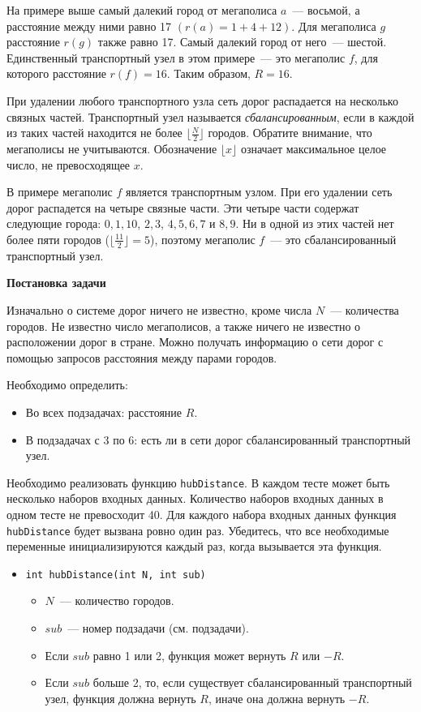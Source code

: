 На примере выше самый далекий город от мегаполиса $a$~--- восьмой, а расстояние между
ними равно 17 $(r(a) = 1 + 4 + 12)$. Для мегаполиса $g$ расстояние $r(g)$ также равно 17.
Самый далекий город от него~--- шестой. Единственный транспортный узел в этом примере~---
это мегаполис $f$, для которого расстояние $r(f) = 16$. Таким образом, $R = 16$.

При удалении любого транспортного узла сеть дорог распадается на несколько связных
частей. Транспортный узел называется \textit{сбалансированным}, если в каждой из таких частей
находится не более $\lfloor \frac{N}{2} \rfloor$ городов. Обратите внимание, что мегаполисы не учитываются.
Обозначение $\lfloor x \rfloor$ означает максимальное целое число, не превосходящее $x$.

В примере мегаполис $f$ является транспортным узлом. При его удалении сеть дорог
распадется на четыре связные части. Эти четыре части содержат следующие города:
{$0,1,10$}, {$2,3$}, {$4,5,6,7$} и {$8,9$}. Ни в одной из этих частей нет более пяти городов
($\lfloor \frac{11}{2} \rfloor = 5$), поэтому мегаполис $f$~--- это сбалансированный транспортный узел.

\textbf{Постановка задачи}

Изначально о системе дорог ничего не известно, кроме числа $N$~--- количества городов. Не
известно число мегаполисов, а также ничего не известно о расположении дорог в стране.
Можно получать информацию о сети дорог с помощью запросов расстояния между парами
городов.

Необходимо определить:
\begin{itemize}
\item Во всех подзадачах: расстояние $R$.
\item В подзадачах с $3$ по $6$: есть ли в сети дорог сбалансированный транспортный узел.
\end{itemize}

Необходимо реализовать функцию \texttt{hubDistance}. В каждом тесте может быть несколько
наборов входных данных. Количество наборов входных данных в одном тесте не превосходит
40. Для каждого набора входных данных функция \texttt{hubDistance} будет вызвана ровно один раз.
Убедитесь, что все необходимые переменные инициализируются каждый раз, когда
вызывается эта функция.

\begin{itemize}
\item \texttt{int hubDistance(int N, int sub)}
\begin{itemize} 
\item $N$~--- количество городов.
\item $sub$~--- номер подзадачи (см. подзадачи).
\item Если $sub$ равно 1 или 2, функция может вернуть $R$ или $-R$.
\item Если $sub$ больше 2, то, если существует сбалансированный транспортный узел,
функция должна вернуть $R$, иначе она должна вернуть $-R$.
\end{itemize}
\end{itemize}

